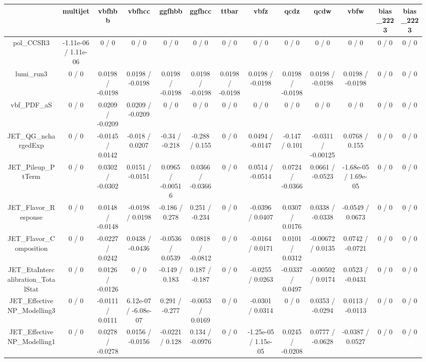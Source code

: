 \documentclass[10pt]{article}
\begin{document}
\begin{table}[htbp]
\begin{center}
\begin{tabular}{|c|c|c|c|c|c|c|c|c|c|c|c|c|}
\hline 
      & multijet      & vbfhbb      & vbfhcc      & ggfhbb      & ggfhcc      & ttbar      & vbfz      & qcdz      & qcdw      & vbfw      & bias_2223      & bias_2223 \\ 
\hline 
  pol_CCSR3 & -1.11e-06 / 1.11e-06 & 0 / 0 & 0 / 0 & 0 / 0 & 0 / 0 & 0 / 0 & 0 / 0 & 0 / 0 & 0 / 0 & 0 / 0 & 0 / 0 & 0 / 0 \\ 
  lumi_run3 & 0 / 0 & 0.0198 / -0.0198 & 0.0198 / -0.0198 & 0.0198 / -0.0198 & 0.0198 / -0.0198 & 0.0198 / -0.0198 & 0.0198 / -0.0198 & 0.0198 / -0.0198 & 0.0198 / -0.0198 & 0.0198 / -0.0198 & 0 / 0 & 0 / 0 \\ 
  vbf_PDF_aS & 0 / 0 & 0.0209 / -0.0209 & 0.0209 / -0.0209 & 0 / 0 & 0 / 0 & 0 / 0 & 0 / 0 & 0 / 0 & 0 / 0 & 0 / 0 & 0 / 0 & 0 / 0 \\ 
  JET_QG_nchargedExp & 0 / 0 & -0.0145 / 0.0142 & -0.018 / 0.0207 & -0.34 / -0.218 & -0.288 / 0.155 & 0 / 0 & 0.0494 / -0.0147 & -0.147 / 0.101 & -0.0311 / -0.00125 & 0.0768 / 0.155 & 0 / 0 & 0 / 0 \\ 
  JET_Pileup_PtTerm & 0 / 0 & 0.0302 / -0.0302 & 0.0151 / -0.0151 & 0.0965 / -0.00516 & 0.0366 / -0.0366 & 0 / 0 & 0.0514 / -0.0514 & 0.0724 / -0.0366 & 0.0661 / -0.0523 & -1.68e-05 / 1.69e-05 & 0 / 0 & 0 / 0 \\ 
  JET_Flavor_Response & 0 / 0 & 0.0148 / -0.0148 & -0.0198 / 0.0198 & -0.186 / 0.278 & 0.251 / -0.234 & 0 / 0 & -0.0396 / 0.0407 & 0.0307 / 0.0176 & 0.0338 / -0.0338 & -0.0549 / 0.0673 & 0 / 0 & 0 / 0 \\ 
  JET_Flavor_Composition & 0 / 0 & -0.0227 / 0.0242 & 0.0438 / -0.0436 & -0.0536 / 0.0539 & 0.0818 / -0.0812 & 0 / 0 & -0.0164 / 0.0171 & 0.0101 / 0.0312 & -0.00672 / 0.0135 & 0.0742 / -0.0721 & 0 / 0 & 0 / 0 \\ 
  JET_EtaIntercalibration_TotalStat & 0 / 0 & 0.0126 / -0.0126 & 0 / 0 & -0.149 / 0.183 & 0.187 / -0.187 & 0 / 0 & -0.0255 / 0.0263 & -0.0337 / 0.0497 & -0.00502 / 0.0174 & 0.0523 / -0.0431 & 0 / 0 & 0 / 0 \\ 
  JET_EffectiveNP_Modelling3 & 0 / 0 & -0.0111 / 0.0111 & 6.12e-07 / -6.08e-07 & 0.291 / -0.277 & -0.0053 / 0.0169 & 0 / 0 & -0.0301 / 0.0314 & 0 / 0 & 0.0353 / -0.0294 & 0.0113 / -0.0113 & 0 / 0 & 0 / 0 \\ 
  JET_EffectiveNP_Modelling1 & 0 / 0 & 0.0278 / -0.0278 & 0.0156 / -0.0156 & -0.0221 / 0.128 & 0.134 / -0.0976 & 0 / 0 & -1.25e-05 / 1.15e-05 & 0.0245 / -0.0208 & 0.0777 / -0.0628 & -0.0387 / 0.0527 & 0 / 0 & 0 / 0 \\ 

\end{tabular}
\end{center}
\end{table}
\end{document}
